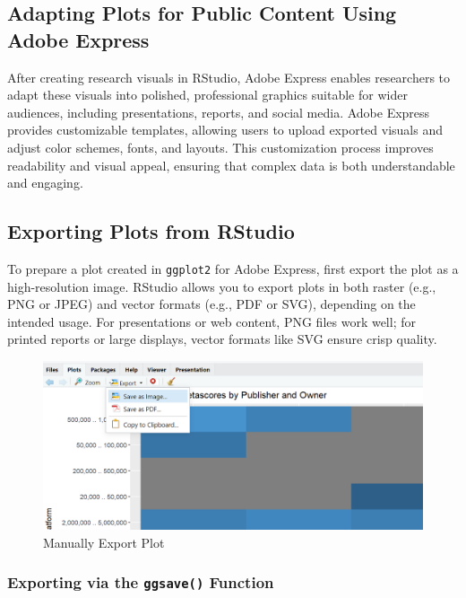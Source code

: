 \documentclass[
]{book}
\begin{document}
\subsection*{Adapting Plots for Public Content Using Adobe Express}\label{adapting-plots-for-public-content-using-adobe-express}

After creating research visuals in RStudio, Adobe Express enables researchers to adapt these visuals into polished, professional graphics suitable for wider audiences, including presentations, reports, and social media. Adobe Express provides customizable templates, allowing users to upload exported visuals and adjust color schemes, fonts, and layouts. This customization process improves readability and visual appeal, ensuring that complex data is both understandable and engaging.

\subsection*{Exporting Plots from RStudio}\label{exporting-plots-from-rstudio}

To prepare a plot created in \texttt{ggplot2} for Adobe Express, first export the plot as a high-resolution image. RStudio allows you to export plots in both raster (e.g., PNG or JPEG) and vector formats (e.g., PDF or SVG), depending on the intended usage. For presentations or web content, PNG files work well; for printed reports or large displays, vector formats like SVG ensure crisp quality.

\begin{figure}
\centering
\includegraphics[width=1\textwidth,height=\textheight]{images/export_plot.png}
\caption{Manually Export Plot}
\end{figure}

\subsubsection*{\texorpdfstring{Exporting via the \texttt{ggsave()} Function}{Exporting via the ggsave() Function}}\label{exporting-via-the-ggsave-function}
\end{document}
